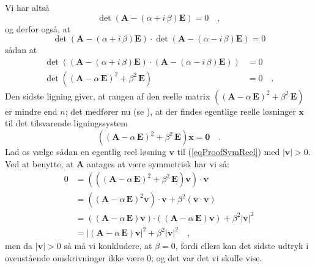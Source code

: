 \begin{bevis}
Vi har altså
\begin{equation}
\det\left(\mathbf{A} - (\alpha + i\,\beta)\mathbf{E}\right) = 0 \quad ,
\end{equation}
og derfor også, at
\begin{equation}
\det\left(\mathbf{A} - (\alpha + i\,\beta)\mathbf{E} \right) \cdot \det\left(\mathbf{A} - (\alpha - i\,\beta)\mathbf{E} \right) = 0
\end{equation}
sådan at
\begin{equation}
\begin{aligned}
\det\left(\left(\mathbf{A} - (\alpha + i\,\beta)\mathbf{E} \right)\cdot\left(\mathbf{A} - (\alpha - i\,\beta)\mathbf{E} \right)\right) &= 0 \\
\det\left(\left(\mathbf{A} - \alpha\,\mathbf{E} \right)^{2} + \beta^{2}\,\mathbf{E} \right) &= 0 \quad .
\end{aligned}
\end{equation}
Den sidste ligning giver, at rangen af  den reelle matrix $\left(\left(\mathbf{A} - \alpha\,\mathbf{E} \right)^{2} + \beta^{2}\,\mathbf{E} \right)$ er mindre end $n$; det medfører nu (se ), at der findes egentlige reelle løsninger $\mathbf{x}$ til det tilsvarende ligningssystem
\begin{equation} \label{eqProofSymReel}
\left(\left(\mathbf{A} - \alpha\,\mathbf{E} \right)^{2} + \beta^{2}\,\mathbf{E} \right)\mathbf{x} = \mathbf{0} \quad .
\end{equation}
Lad os vælge sådan en egentlig reel løsning $\mathbf{v}$ til (\ref{eqProofSymReel}) med $\vert \mathbf{v} \vert > 0$. Ved at benytte, at $\mathbf{A}$ antages at være symmetrisk har vi så:
\begin{equation}
\begin{aligned}
0 &= \left(\left( \left(\mathbf{A} - \alpha\,\mathbf{E} \right)^{2} + \beta^{2}\,\mathbf{E}\right) \mathbf{v}\right)\cdot \mathbf{v} \\
&= \left(\left(\mathbf{A} - \alpha\,\mathbf{E} \right)^{2}\mathbf{v}\right)\cdot \mathbf{v} + \beta^{2}\left(\mathbf{v} \cdot \mathbf{v} \right) \\
&= \left(\left(\mathbf{A} - \alpha\,\mathbf{E} \right)\mathbf{v}\right)\bm{\cdot}\left(\left(\mathbf{A} - \alpha\,\mathbf{E} \right)\mathbf{v}\right) + \beta^{2}\vert \mathbf{v} \vert^{2} \\
&= \vert \left(\mathbf{A} - \alpha\,\mathbf{E} \right)\mathbf{v} \vert^{2} + \beta^{2}\vert \mathbf{v} \vert^{2} \quad,
\end{aligned}
\end{equation}
men da $\vert \mathbf{v} \vert > 0$ så må vi konkludere, at $\beta = 0$, fordi ellers kan det sidste udtryk i ovenstående omskrivninger  ikke være $0$; og det var det vi skulle vise.
\end{bevis}

